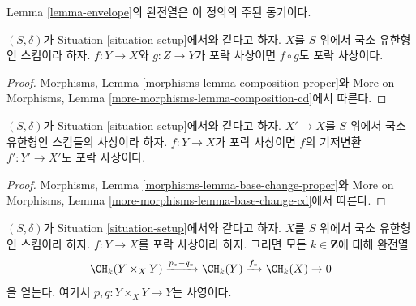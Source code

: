 \noindent
Lemma \ref{lemma-envelope}의 완전열은 이 정의의 주된 동기이다.

\begin{lemma}
\label{lemma-composition-envelope}
$(S, \delta)$가 Situation \ref{situation-setup}에서와 같다고 하자.
$X$를 $S$ 위에서 국소 유한형인 스킴이라 하자.
$f : Y \to X$와 $g : Z \to Y$가 포락 사상이면
$f \circ g$도 포락 사상이다.
\end{lemma}

\begin{proof}
Morphisms, Lemma \ref{morphisms-lemma-composition-proper}와
More on Morphisms, Lemma \ref{more-morphisms-lemma-composition-cd}에서
따른다.
\end{proof}

\begin{lemma}
\label{lemma-base-change-envelope}
$(S, \delta)$가 Situation \ref{situation-setup}에서와 같다고 하자.
$X' \to X$를 $S$ 위에서 국소 유한형인 스킴들의 사상이라 하자.
$f : Y \to X$가 포락 사상이면 $f$의 기저변환
$f' : Y' \to X'$도 포락 사상이다.
\end{lemma}

\begin{proof}
Morphisms, Lemma \ref{morphisms-lemma-base-change-proper}와
More on Morphisms, Lemma \ref{more-morphisms-lemma-base-change-cd}에서
따른다.
\end{proof}

\begin{lemma}
\label{lemma-envelope}
$(S, \delta)$가 Situation \ref{situation-setup}에서와 같다고 하자.
$X$를 $S$ 위에서 국소 유한형인 스킴이라 하자.
$f : Y \to X$를 포락 사상이라 하자. 그러면 모든
$k \in \mathbf{Z}$에 대해 완전열
$$
\CH_k(Y \times_X Y) \xrightarrow{p_* - q_*}
\CH_k(Y) \xrightarrow{f_*}
\CH_k(X) \to 0
$$
을 얻는다. 여기서 $p, q : Y \times_X Y \to Y$는 사영이다.
\end{lemma}

